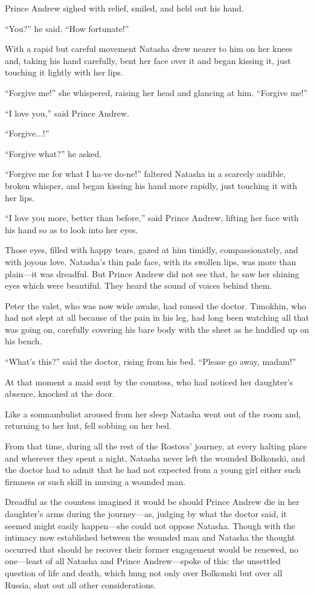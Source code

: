 Prince Andrew sighed with relief, smiled, and held out his hand.

``You?'' he said. ``How fortunate!''

With a rapid but careful movement Natasha drew nearer to him on
her knees and, taking his hand carefully, bent her face over it
and began kissing it, just touching it lightly with her lips.

``Forgive me!'' she whispered, raising her head and glancing at
him.  ``Forgive me!''

``I love you,'' said Prince Andrew.

``Forgive...!''

``Forgive what?'' he asked.

``Forgive me for what I ha-ve do-ne!'' faltered Natasha in a
scarcely audible, broken whisper, and began kissing his hand more
rapidly, just touching it with her lips.

``I love you more, better than before,'' said Prince Andrew,
lifting her face with his hand so as to look into her eyes.

Those eyes, filled with happy tears, gazed at him timidly,
compassionately, and with joyous love. Natasha's thin pale face,
with its swollen lips, was more than plain---it was dreadful. But
Prince Andrew did not see that, he saw her shining eyes which
were beautiful.  They heard the sound of voices behind them.

Peter the valet, who was now wide awake, had roused the doctor.
Timokhin, who had not slept at all because of the pain in his
leg, had long been watching all that was going on, carefully
covering his bare body with the sheet as he huddled up on his
bench.

``What's this?'' said the doctor, rising from his bed. ``Please
go away, madam!''

At that moment a maid sent by the countess, who had noticed her
daughter's absence, knocked at the door.

Like a somnambulist aroused from her sleep Natasha went out of
the room and, returning to her hut, fell sobbing on her bed.

From that time, during all the rest of the Rostovs' journey, at
every halting place and wherever they spent a night, Natasha
never left the wounded Bolkonski, and the doctor had to admit
that he had not expected from a young girl either such firmness
or such skill in nursing a wounded man.

Dreadful as the countess imagined it would be should Prince
Andrew die in her daughter's arms during the journey---as,
judging by what the doctor said, it seemed might easily
happen---she could not oppose Natasha. Though with the intimacy
now established between the wounded man and Natasha the thought
occurred that should he recover their former engagement would be
renewed, no one---least of all Natasha and Prince Andrew---spoke
of this: the unsettled question of life and death, which hung not
only over Bolkonski but over all Russia, shut out all other
considerations.

